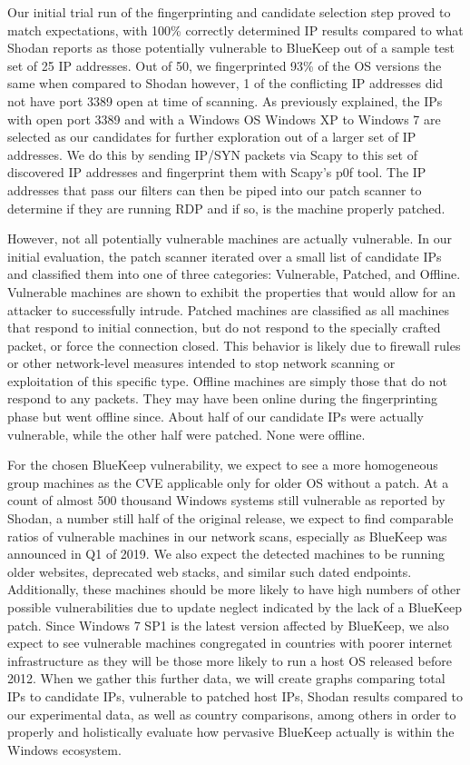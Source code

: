 Our initial trial run of the fingerprinting and candidate selection step proved to match expectations, with 100\% correctly determined IP results compared to what Shodan reports as those potentially vulnerable to BlueKeep out of a sample test set of 25 IP addresses. Out of 50, we fingerprinted 93\% of the OS versions the same when compared to Shodan however, 1 of the conflicting IP addresses did not have port 3389 open at time of scanning. As previously explained, the IPs with open port 3389 and with a Windows OS Windows XP to Windows 7 are selected as our candidates for further exploration out of a larger set of IP addresses. We do this by sending IP/SYN packets via Scapy to this set of discovered IP addresses and fingerprint them with Scapy's p0f tool. The IP addresses that pass our filters can then be piped into our patch scanner to determine if they are running RDP and if so, is the machine properly patched.

However, not all potentially vulnerable machines are actually vulnerable. In our initial evaluation, the patch scanner iterated over a small list of candidate IPs and classified them into one of three categories: Vulnerable, Patched, and Offline. Vulnerable machines are shown to exhibit the properties that would allow for an attacker to successfully intrude. Patched machines are classified as all machines that respond to initial connection, but do not respond to the specially crafted packet, or force the connection closed. This behavior is likely due to firewall rules or other network-level measures intended to stop network scanning or exploitation of this specific type. Offline machines are simply those that do not respond to any packets. They may have been online during the fingerprinting phase but went offline since. About half of our candidate IPs were actually vulnerable, while the other half were patched. None were offline.

For the chosen BlueKeep vulnerability, we expect to see a more homogeneous group machines as the CVE applicable only for older OS without a patch. At a count of almost 500 thousand Windows systems still vulnerable as reported by Shodan, a number still half of the original release, we expect to find comparable ratios of vulnerable machines in our network scans, especially as BlueKeep was announced in Q1 of 2019. We also expect the detected machines to be running older websites, deprecated web stacks, and similar such dated endpoints. Additionally, these machines should be more likely to have high numbers of other possible vulnerabilities due to update neglect indicated by the lack of a BlueKeep patch. Since Windows 7 SP1 is the latest version affected by BlueKeep, we also expect to see vulnerable machines congregated in countries with poorer internet infrastructure as they will be those more likely to run a host OS released before 2012. When we gather this further data, we will create graphs comparing total IPs to candidate IPs, vulnerable to patched host IPs, Shodan results compared to our experimental data, as well as country comparisons, among others in order to properly and holistically evaluate how pervasive BlueKeep actually is within the Windows ecosystem.

